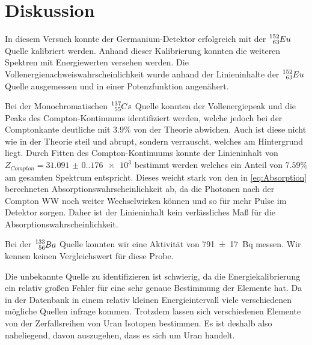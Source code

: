 \newpage
\section{Diskussion}

In diesem Versuch konnte der Germanium-Detektor erfolgreich mit der
$\ce{^{152}_{63}}Eu$ Quelle kalibriert werden. Anhand dieser Kalibrierung
konnten die weiteren Spektren mit Energiewerten versehen werden. Die
Vollenergienachweiswahrscheinlichkeit wurde anhand der Linieninhalte der
$\ce{^{152}_{63}}Eu$ Quelle ausgemessen und in einer Potenzfunktion angenähert.

Bei der Monochromatischen $\ce{^{137}_{55}}Cs$ Quelle konnten der
Vollenergiepeak und die Peaks des Compton-Kontinuums identifiziert werden,
welche jedoch bei der Comptonkante deutliche mit $3.9\%$ von der Theorie
abwichen. Auch ist diese nicht wie in der Theorie steil und abrupt, sondern
verrauscht, welches am Hintergrund liegt. Durch Fitten des Compton-Kontinuums
konnte der Linieninhalt von $Z_{Compton}=\num{31.091(0.176)e3}$ bestimmt werden
welches ein Anteil von $7.59\%$ am gesamten Spektrum entspricht. Dieses weicht
stark von den in \eqref{eq:Absorption} berechneten
Absorptionswahrscheinlichkeit ab, da die Photonen nach der Compton WW noch
weiter Wechselwirken können und so für mehr Pulse im Detektor sorgen. Daher ist
der Linieninhalt kein verlässliches Maß für die Absorptionswahrscheinlichkeit.

Bei der $\ce{^{133}_{56}}Ba$ Quelle konnten wir eine Aktivität von
\qty{791(17)}{\becquerel} messen. Wir kennen keinen Vergleichswert für diese
Probe.

Die unbekannte Quelle zu identifizieren ist schwierig, da die
Energiekalibrierung ein relativ großen Fehler für eine sehr genaue Bestimmung
der Elemente hat. Da in der Datenbank in einem relativ kleinen Energieintervall
viele verschiedenen mögliche Quellen infrage kommen. Trotzdem lassen sich
verschiedenen Elemente von der Zerfallsreihen von Uran Isotopen bestimmen. Es
ist deshalb also naheliegend, davon auszugehen, dass es sich um Uran handelt.

\newpage
\printbibliography

